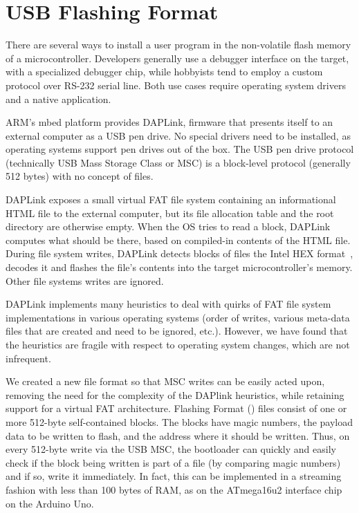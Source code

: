\section{USB Flashing Format}
\label{sec:uf2}

There are several ways to install a user program in the non-volatile flash memory
of a microcontroller. Developers generally use a debugger
interface on the target, with a specialized debugger chip, 
while hobbyists tend to employ a custom protocol over RS-232 serial
line. Both use cases require operating system drivers and a native application.

ARM's mbed platform provides DAPLink, firmware that presents itself to an external computer
as a USB pen drive. No special drivers need to be installed, as operating
systems support pen drives out of the box. The USB pen drive protocol (technically USB Mass
Storage Class or MSC) is a block-level protocol (generally 512 bytes) with no
concept of files.

DAPLink exposes a small virtual FAT file system containing an informational HTML file
to the external computer, 
but its file allocation table and the root directory are otherwise empty.
When the OS tries to read a block, DAPLink computes what should be there, 
based on compiled-in contents of the HTML file.
During file system writes, DAPLink detects blocks of files the Intel HEX format~\cite{IntelHEX}, 
decodes it and flashes the file's contents into the target microcontroller's memory. 
Other file systems writes are ignored.

DAPLink implements many heuristics to deal with quirks of FAT file
system implementations in various operating systems (order of writes, various meta-data files
that are created and need to be ignored, etc.).  However, we have found that the
heuristics are fragile with respect to operating system changes, which are not infrequent.

We created a new file format so that MSC writes can be easily acted upon, removing
the need for the complexity of the DAPlink heuristics, while retaining support for 
a virtual FAT architecture.
Flashing Format (\UF) files consist of one or more 512-byte self-contained blocks.
The blocks have magic numbers, the payload data to be written to flash,
and the address where it should be written.
Thus, on every 512-byte write via the USB MSC, the bootloader can quickly and easily
check if the block being written is part of a \UF file (by comparing magic numbers)
and if so, write it immediately. In fact, this can be implemented in a streaming
fashion with less than 100 bytes of RAM, as on the ATmega16u2 interface chip
on the Arduino Uno.

